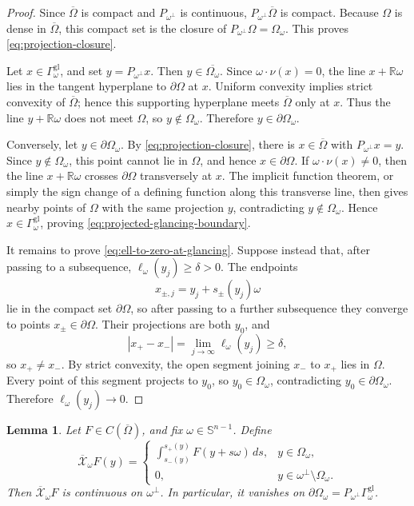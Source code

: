 \documentclass[11pt]{article}
\numberwithin{equation}{section}
\newtheorem{lemma}[theorem]{Lemma}
\newcommand{\R}{\mathbb R}
\newcommand{\Sn}{\mathbb S^{n-1}}
\newcommand{\Xray}{\mathcal X}
\begin{document}
\begin{proof}
Since \(\overline\Omega\) is compact and \(P_{\omega^\perp}\) is continuous, \(P_{\omega^\perp}\overline\Omega\) is compact.  Because \(\Omega\) is dense in \(\overline\Omega\), this compact set is the closure of \(P_{\omega^\perp}\Omega=\Omega_\omega\).  This proves \eqref{eq:projection-closure}.

Let \(x\in\Gamma_\omega^{\mathrm{gl}}\), and set \(y=P_{\omega^\perp}x\).  Then \(y\in\overline{\Omega_\omega}\).  Since \(\omega\cdot\nu(x)=0\), the line \(x+\R\omega\) lies in the tangent hyperplane to \(\partial\Omega\) at \(x\).  Uniform convexity implies strict convexity of \(\overline\Omega\); hence this supporting hyperplane meets \(\overline\Omega\) only at \(x\).  Thus the line \(y+\R\omega\) does not meet \(\Omega\), so \(y\notin\Omega_\omega\).  Therefore \(y\in\partial\Omega_\omega\).

Conversely, let \(y\in\partial\Omega_\omega\).  By \eqref{eq:projection-closure}, there is \(x\in\overline\Omega\) with \(P_{\omega^\perp}x=y\).  Since \(y\notin\Omega_\omega\), this point cannot lie in \(\Omega\), and hence \(x\in\partial\Omega\).  If \(\omega\cdot\nu(x)\ne0\), then the line \(x+\R\omega\) crosses \(\partial\Omega\) transversely at \(x\).  The implicit function theorem, or simply the sign change of a defining function along this transverse line, then gives nearby points of \(\Omega\) with the same projection \(y\), contradicting \(y\notin\Omega_\omega\).  Hence \(x\in\Gamma_\omega^{\mathrm{gl}}\), proving \eqref{eq:projected-glancing-boundary}.

It remains to prove \eqref{eq:ell-to-zero-at-glancing}.  Suppose instead that, after passing to a subsequence, \(\ell_\omega(y_j)\ge\delta>0\).  The endpoints
\[
    x_{\pm,j}=y_j+s_\pm(y_j)\omega
\]
lie in the compact set \(\partial\Omega\), so after passing to a further subsequence they converge to points \(x_\pm\in\partial\Omega\).  Their projections are both \(y_0\), and
\[
    |x_+-x_-|=\lim_{j\to\infty}\ell_\omega(y_j)\ge\delta,
\]
so \(x_+\ne x_-\).  By strict convexity, the open segment joining \(x_-\) to \(x_+\) lies in \(\Omega\).  Every point of this segment projects to \(y_0\), so \(y_0\in\Omega_\omega\), contradicting \(y_0\in\partial\Omega_\omega\).  Therefore \(\ell_\omega(y_j)\to0\).
\end{proof}

\begin{lemma}\label{lem:xray-continuous-extension}
Let \(F\in C(\overline\Omega)\), and fix \(\omega\in\Sn\).  Define
\begin{equation}\label{eq:extended-chord-transform}
    \overline{\Xray}_\omega F(y)
    =
    \begin{cases}
    \displaystyle\int_{s_-(y)}^{s_+(y)}F(y+s\omega)\,ds,& y\in\Omega_\omega,\\[1.2em]
    0,& y\in\omega^\perp\setminus\Omega_\omega.
    \end{cases}
\end{equation}
Then \(\overline{\Xray}_\omega F\) is continuous on \(\omega^\perp\).  In particular, it vanishes on \(\partial\Omega_\omega=P_{\omega^\perp}\Gamma_\omega^{\mathrm{gl}}\).
\end{lemma}
\end{document}
